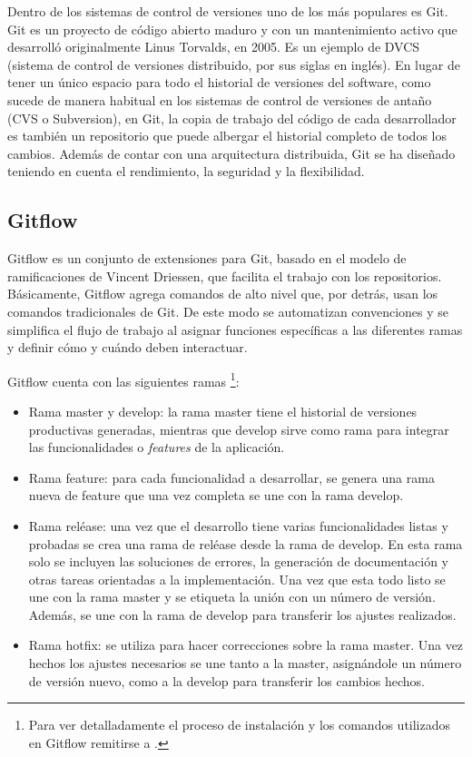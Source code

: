 Dentro de los sistemas de control de versiones uno de los más populares es Git. Git es un proyecto de código abierto maduro y con un mantenimiento activo que desarrolló originalmente Linus Torvalds, en 2005. Es un ejemplo de DVCS (sistema de control de versiones distribuido, por sus siglas en inglés). En lugar de tener un único espacio para todo el historial de versiones del software, como sucede de manera habitual en los sistemas de control de versiones de antaño (CVS o Subversion), en Git, la copia de trabajo del código de cada desarrollador es también un repositorio que puede albergar el historial completo de todos los cambios. Además de contar con una arquitectura distribuida, Git se ha diseñado teniendo en cuenta el rendimiento, la seguridad y la flexibilidad.

\subsection{Gitflow}

Gitflow es un conjunto de extensiones para Git, basado en el modelo de ramificaciones de Vincent Driessen, que facilita el trabajo con los repositorios. Básicamente, Gitflow agrega comandos de alto nivel que, por detrás, usan los comandos tradicionales de Git. De este modo se automatizan convenciones y se simplifica el flujo de trabajo al asignar funciones específicas a las diferentes ramas y definir cómo y cuándo deben interactuar.

Gitflow cuenta con las siguientes ramas \footnote{Para ver detalladamente el proceso de instalación y los comandos utilizados en Gitflow remitirse a \citep{WEBSITE:GitflowDetalle}.}: 

\begin{itemize}
\item Rama master y develop: la rama master tiene el historial de versiones productivas generadas, mientras que develop sirve como rama para integrar las funcionalidades o \textit{features} de la aplicación. 
\item Rama feature: para cada funcionalidad a desarrollar, se genera una rama nueva de feature que una vez completa se une con la rama develop.
\item Rama reléase: una vez que el desarrollo tiene varias funcionalidades listas y probadas se crea una rama de reléase desde la rama de develop. En esta rama solo se incluyen las soluciones de errores, la generación de documentación y otras tareas orientadas a la implementación. Una vez que esta todo listo se une con la rama master y se etiqueta la unión con un número de versión. Además, se une con la rama de develop para transferir los ajustes realizados. 
\item Rama hotfix: se utiliza para hacer correcciones sobre la rama master. Una vez hechos los ajustes necesarios se une tanto a la master, asignándole un número de versión nuevo, como a la develop para transferir los cambios hechos.
\end{itemize}

